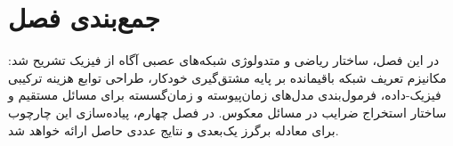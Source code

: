 \section{جمع‌بندی فصل}
\label{sec:ch3-summary}

در این فصل، ساختار ریاضی و متدولوژی شبکه‌های عصبی آگاه از فیزیک تشریح شد: مکانیزم تعریف شبکه باقیمانده بر پایه مشتق‌گیری خودکار، طراحی توابع هزینه ترکیبی فیزیک-داده، فرمول‌بندی مدل‌های زمان‌پیوسته و زمان‌گسسته برای مسائل مستقیم و ساختار استخراج ضرایب در مسائل معکوس. در فصل چهارم، پیاده‌سازی این چارچوب برای معادله برگرز یک‌بعدی و نتایج عددی حاصل ارائه خواهد شد.
